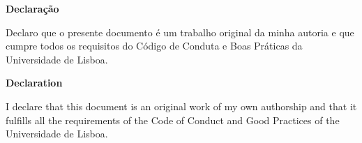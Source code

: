\noindent
\par \textbf{Declaração}
\par Declaro que o presente documento é um trabalho original da minha autoria e que cumpre todos os requisitos do Código de Conduta e Boas Práticas da Universidade de Lisboa.

\bigskip
\par \textbf{Declaration}
\par I declare that this document is an original work of my own authorship and that it fulfills all the requirements of the Code of Conduct and Good Practices of the Universidade de Lisboa.